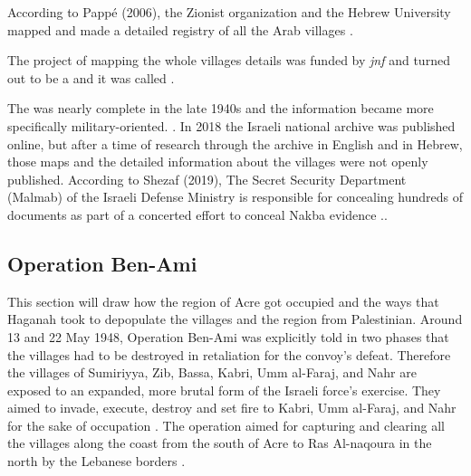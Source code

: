 According to Pappé (2006), the Zionist organization and the Hebrew University mapped and made a detailed registry of all the Arab villages \citep{Pappe2006}.



The project of mapping the whole villages details was funded by \textit{\acrfull{jnf}} and turned out to be a  and it was called \citep{Pappe2006}. 


The  was nearly complete in the late 1940s and the information became more specifically military-oriented. \citep{Pappe2006}. In 2018 the Israeli national archive was published online, but after a time of research through the archive in English and in Hebrew, those maps and the detailed information about the villages were not openly published. According to Shezaf (2019), The Secret Security Department (Malmab) of the Israeli Defense Ministry is responsible for concealing hundreds of documents as part of a concerted effort to conceal Nakba evidence \citep{Shezaf2019}.\citep{Shezaf2019}.


\subsection{Operation Ben-Ami}

This section will draw how the region of Acre got occupied and the ways that Haganah took to depopulate the villages and the region from Palestinian. Around 13 and 22 May 1948, Operation Ben-Ami was explicitly told in two phases that the villages had to be destroyed in retaliation for the convoy's defeat. Therefore the villages of Sumiriyya, Zib, Bassa, Kabri, Umm al-Faraj, and Nahr are exposed to an expanded, more brutal form of the Israeli force's  exercise. They aimed to invade, execute, destroy and set fire to Kabri, Umm al-Faraj, and Nahr for the sake of occupation \citep{Pappe2006}. The operation aimed for capturing and clearing all the villages along the coast from the south of Acre to Ras Al-naqoura in the north by the Lebanese borders \citep{Morris2004, Morris2008}.

